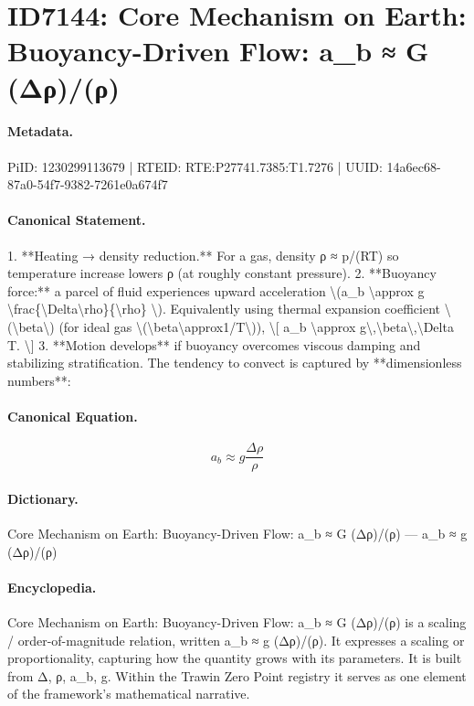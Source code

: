 \section*{ID7144: Core Mechanism on Earth: Buoyancy-Driven Flow: a\_b ≈ G (Δρ)/(ρ)}
\paragraph{Metadata.}
PiID: 1230299113679 | RTEID: RTE:P27741.7385:T1.7276 | UUID: 14a6ec68-87a0-54f7-9382-7261e0a674f7

\paragraph{Canonical Statement.}
1. **Heating → density reduction.** For a gas, density ρ ≈ p/(RT) so temperature increase lowers ρ (at roughly constant pressure). 2. **Buoyancy force:** a parcel of fluid experiences upward acceleration \textbackslash{}(a\_b \textbackslash{}approx g \textbackslash{}frac\{\textbackslash{}Delta\textbackslash{}rho\}\{\textbackslash{}rho\} \textbackslash{}). Equivalently using thermal expansion coefficient \textbackslash{}(\textbackslash{}beta\textbackslash{}) (for ideal gas \textbackslash{}(\textbackslash{}beta\textbackslash{}approx1/T\textbackslash{})), \textbackslash{}[ a\_b \textbackslash{}approx g\textbackslash{},\textbackslash{}beta\textbackslash{},\textbackslash{}Delta T. \textbackslash{}] 3. **Motion develops** if buoyancy overcomes viscous damping and stabilizing stratification. The tendency to convect is captured by **dimensionless numbers**:

\paragraph{Canonical Equation.}
\[
a_b \approx g \frac{\Delta\rho}{\rho}
\]

\paragraph{Dictionary.}
Core Mechanism on Earth: Buoyancy-Driven Flow: a\_b ≈ G (Δρ)/(ρ) — a\_b ≈ g (Δρ)/(ρ)

\paragraph{Encyclopedia.}
Core Mechanism on Earth: Buoyancy-Driven Flow: a\_b ≈ G (Δρ)/(ρ) is a scaling / order-of-magnitude relation, written a\_b ≈ g (Δρ)/(ρ). It expresses a scaling or proportionality, capturing how the quantity grows with its parameters. It is built from Δ, ρ, a\_b, g. Within the Trawin Zero Point registry it serves as one element of the framework's mathematical narrative.
